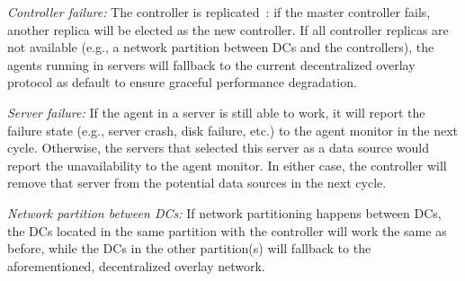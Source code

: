 \begin{packedenumerate}
\item \emph{Controller failure:} The controller is
replicated~\cite{lamport1998part}: if the master controller fails,
another replica will be elected as the new controller. If all
controller replicas are not available (e.g., a network partition
between DCs and the controllers), the agents running in servers will
fallback to the current decentralized overlay protocol as default to
ensure graceful performance degradation.
\item \emph{Server failure:} If the agent in a server is still able to
work, it will report the failure state (e.g., server crash, disk
failure, etc.) to the agent monitor in the next cycle. Otherwise, the
servers that selected this server as a data source would report the
unavailability to the agent monitor. In either case, the controller
will remove that server from the potential data sources in the next
cycle.
\item \emph{Network partition between DCs:}
If network partitioning happens between DCs, the DCs located in the same
partition with the controller will work the same as before, while the
DCs in the other partition(s) will fallback to the aforementioned, decentralized overlay network.
\end{packedenumerate}



